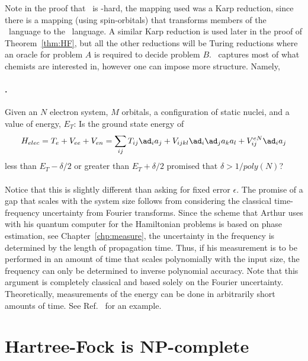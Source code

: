 \documentclass[11pt,oneside,final]{huthesis}%
\begin{document}
Note in the proof that \FLH~is \qma-hard, the mapping used was a Karp reduction, since there is a mapping (using spin-orbitals) that transforms members of the \tLH~language to the \FLH~language.  A similar Karp reduction is used later in the proof of Theorem~\ref{thm:HF}, but all the other reductions will be Turing reductions where an oracle for problem $A$ is required to decide problem $B$.
\FLH~captures most of what chemists are interested in, however one can impose more structure.  Namely,  

\paragraph{\ES.}  Given an $N$ electron system, $M$ orbitals, a configuration of static nuclei, and a value of energy, $E_T$: Is the ground state energy of $$H_{elec}=T_e+V_{ee}+V_{en}=\sum_{ij}T_{ij}\ad_ia_j+V_{ijkl}\ad_{i}\ad_ja_ka_l+V^{eN}_{ij}\ad_ia_j$$ less than $E_T-\delta/2$ or greater than $E_T+\delta/2$ promised that $\delta>1/poly(N)$?

\paragraph*{}
Notice that this is slightly different than asking for fixed error $\epsilon$.
The promise of a gap that scales with the system size follows from considering the classical time-frequency uncertainty from Fourier transforms.  Since the scheme that Arthur uses with his quantum computer for the Hamiltonian problems is based on phase estimation, see Chapter~\ref{chp:measure}, the uncertainty in the frequency is determined by the length of propagation time.   Thus, if his measurement is to be performed in an amount of time that scales polynomially with the input size, the frequency can only be determined to inverse polynomial accuracy. Note that this argument is completely classical and based solely on the Fourier uncertainty. Theoretically, measurements of the energy can be done in arbitrarily short amounts of time.  See Ref.~\cite{Aharonov61} for an example. 


\section{Hartree-Fock is NP-complete}
\end{document}
